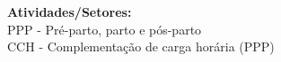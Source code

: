 {\fontsize{10pt}{12pt}\selectfont
\noindent
\textbf{Atividades/Setores:}\\
PPP - Pré-parto, parto e pós-parto\\
CCH - Complementação de carga horária (PPP)
}